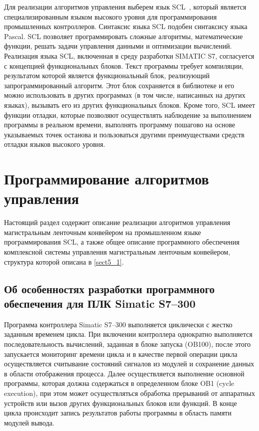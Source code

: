 Для реализации алгоритмов управления выберем язык SCL~\cite{siemens4}, который является специализированным языком высокого уровня для программирования промышленных контроллеров. Синтаксис языка SCL подобен синтаксису языка Pascal. SCL позволяет программировать сложные алгоритмы, математические функции, решать задачи управления данными и оптимизации вычислений. Реализация языка SCL, включенная в среду разработки SIMATIC S7, согласуется с концепцией функциональных блоков. Текст программы требует компиляции, результатом которой является функциональный блок, реализующий запрограммированный алгоритм. Этот блок сохраняется в библиотеке и его можно использовать в других программах (в том числе, написанных на других языках), вызывать его из других функциональных блоков. Кроме того, SCL имеет функции отладки, которые позволяют осуществлять наблюдение за выполнением программы в реальном времени, выполнять программу пошагово на основе указываемых точек останова и пользоваться другими преимуществами средств отладки языков высокого уровня.

\section{Программирование алгоритмов управления} \label{sect5_3}

Настоящий раздел содержит описание реализации алгоритмов управления магистральным ленточным конвейером на промышленном языке программирования SCL, а также общее описание программного обеспечения комплексной системы управления магистральным ленточным конвейером, структура которой описана в \ref{sect5_1}.

\subsection{Об особенностях разработки программного обеспечения для ПЛК Simatic S7--300} \label{subsect5_3_1}
Программа контроллера Simatic S7--300 выполняется циклически с жестко заданным временем цикла. При включении контроллера однократно выполняется последовательность вычислений, заданная в блоке запуска (OB100), после этого запускается мониторинг времени цикла и в качестве первой операции цикла осуществляется считывание состояний сигналов из модулей и сохранение данных в области отображения процесса. Далее осуществляется выполнение основной программы, которая должна содержаться в определенном блоке OB1 (cycle execution), при этом может осуществляться обработка прерываний от аппаратных устройств или вызов других функциональных блоков или функций. В конце цикла происходит запись результатов работы программы в область памяти модулей вывода.

